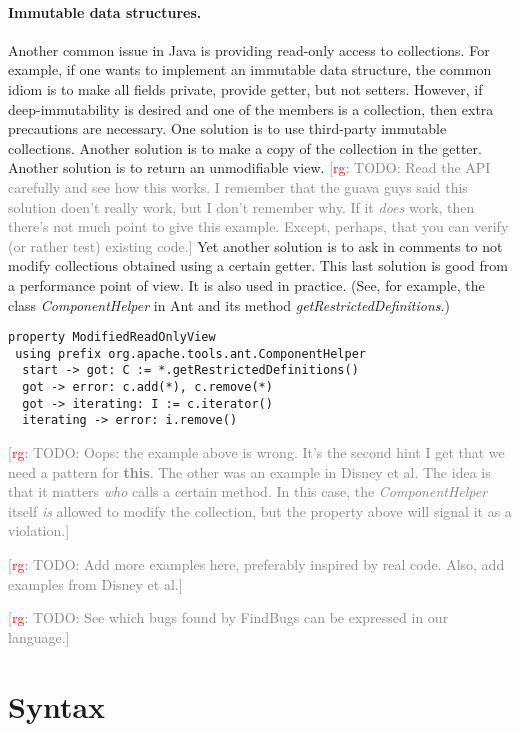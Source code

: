 \documentclass[preprint]{sigplanconf} %
\newcommand{\note}[2]{\textcolor{gray}{[\textcolor{red}{#1}: #2]}}
\newcommand{\rg}[1]{\note{rg}{#1}}
\theoremstyle{definition}
\theoremstyle{remark}
\begin{document}
\paragraph{Immutable data structures.}
Another common issue in Java is providing read-only access to collections.
For example, if one wants to implement an immutable data structure, the common idiom is to make all fields private, provide getter, but not setters.
However, if deep-immutability is desired and one of the members is a collection, then extra precautions are necessary.
One solution is to use third-party immutable collections.
Another solution is to make a copy of the collection in the getter.
Another solution is to return an unmodifiable view.
\rg{TODO: Read the API carefully and see how this works.
I remember that the guava guys said this solution doen't really work, but I don't remember why.
If it \emph{does} work, then there's not much point to give this example.
Except, perhaps, that you can verify (or rather test) existing code.}
Yet another solution is to ask in comments to not modify collections obtained using a certain getter.
This last solution is good from a performance point of view.
It is also used in practice.
(See, for example, the class \textit{ComponentHelper} in Ant and its method \textit{getRestrictedDefinitions}.)
\par\medskip\noindent
\begin{Verbatim}
property ModifiedReadOnlyView
 using prefix org.apache.tools.ant.ComponentHelper
  start -> got: C := *.getRestrictedDefinitions()
  got -> error: c.add(*), c.remove(*)
  got -> iterating: I := c.iterator()
  iterating -> error: i.remove()
\end{Verbatim}
\par\medskip\noindent
\rg{TODO: Oops: the example above is wrong.
It's the second hint I get that we need a pattern for \textbf{this}.
The other was an example in Disney et al.
The idea is that it matters \emph{who} calls a certain method.
In this case, the \textit{ComponentHelper} itself \emph{is} allowed to modify the collection, but the property above will signal it as a violation.}

\rg{TODO: Add more examples here, preferably inspired by real code.
Also, add examples from Disney et al.}

\rg{TODO: See which bugs found by FindBugs can be expressed in our language.}

\section{Syntax}\label{sec:syntax} %
\end{document}
